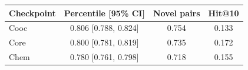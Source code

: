 \begin{tabular}{lccc}
\toprule
Checkpoint & Percentile [95\% CI] & Novel pairs & Hit@10 \\
\midrule
Cooc & 0.806 [0.788, 0.824] & 0.754 & 0.133 \\
Core & 0.800 [0.781, 0.819] & 0.735 & 0.172 \\
Chem & 0.780 [0.761, 0.798] & 0.718 & 0.155 \\
\bottomrule
\end{tabular}
